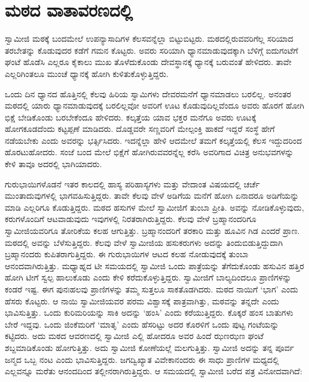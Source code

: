 
\chapter{ಮಠದ ವಾತಾವರಣದಲ್ಲಿ}

 ಸ್ವಾಮೀಜಿ ಮಠಕ್ಕೆ ಬಂದಮೇಲೆ ಉಪನ್ಯಾಸಾದಿಗಳ ಕೆಲಸವನ್ನೆಲ್ಲಾ ಬಿಟ್ಟುಬಿಟ್ಟರು. ಮಠದಲ್ಲಿರುವವರಿಗೆಲ್ಲ ಸರಿಯಾದ ತರಬೇತನ್ನು ಕೊಡುವುದರ ಕಡೆಗೆ ಗಮನ ಕೊಟ್ಟರು. ಅವರು ಸರಿಯಾಗಿ ಧ್ಯಾನಮಾಡುವುದಕ್ಕಾಗಿ ಬೆಳಿಗ್ಗೆ ಐದುಗಂಟೆಗೆ ಘಂಟೆ ಹೊಡೆಸಿ ಎಲ್ಲರೂ ಕೈಕಾಲು ಮುಖ ತೊಳೆದುಕೊಂಡು ದೇವಸ್ಥಾನಕ್ಕೆ ಧ್ಯಾನಕ್ಕೆ ಬರುವಂತೆ ಹೇಳಿದರು. ತಾವೇ ಎಲ್ಲರಿಗಿಂತಲೂ ಮುಂಚೆ ಧ್ಯಾನಕ್ಕೆ ಹೋಗಿ ಕುಳಿತುಕೊಳ್ಳುತ್ತಿದ್ದರು. 

 ಒಂದು ದಿನ ಧ್ಯಾನದ ಹೊತ್ತಿನಲ್ಲಿ ಕೆಲವು ಹಿರಿಯ ಸ್ವಾಮಿಗಳು ದೇವರಮನೆಗೆ ಧ್ಯಾನಮಾಡಲು ಬರಲಿಲ್ಲ. ಅನಂತರ ಮಠದಲ್ಲಿ ಯಾರು ಧ್ಯಾನಮಾಡುವುದಕ್ಕೆ ಬರಲಿಲ್ಲವೋ ಅವರಿಗೆ ಊಟ ಕೊಡುವುದಿಲ್ಲವೆಂದೂ ಅವರು ಹೊರಗೆ ಹೋಗಿ ಭಿಕ್ಷೆ ಬೇಡಿಕೊಂಡು ಬರಬೇಕೆಂದೂ ಹೇಳಿದರು. ಕಲ್ಕತ್ತೆಯ ಯಾವ ಭಕ್ತರ ಮನೆಗೂ ಅವರು ಊಟಕ್ಕೆ ಹೋಗಕೂಡದೆಂದು ಕಟ್ಟಪ್ಪಣೆ ಮಾಡಿದರು. ದೊಡ್ಡವರೇ ಸಣ್ಣವರಿಗೆ ಮೇಲ್ಪಂಕ್ತಿ ಹಾಕದೆ ಇದ್ದರೆ ಸಂಸ್ಥೆ ಹೇಗೆ ನಡೆಯಬೇಕು ಎಂದು ಅವರನ್ನು ಭರ್ತ್ಸಿಸಿದರು. ಇದನ್ನೆಲ್ಲಾ ಹೇಳಿ ಆದಮೇಲೆ ತಮಗೆ ಕಲ್ಕತ್ತೆಯಲ್ಲಿ ಕೆಲಸ ಇದ್ದುದರಿಂದ ಹೊರಟುಹೋದರು. ಸಂಜೆ ಬಂದ ಮೇಲೆ ಭಿಕ್ಷೆಗೆ ಹೋಗಿರುವವರನ್ನೆಲ್ಲ ಕರೆಸಿ ಅವರಿಗಾದ ವಿಚಿತ್ರ ಅನುಭವಗಳನ್ನು ಕೇಳಿ ತಾವೂ ಅದರಲ್ಲಿ ಭಾಗಿಯಾದರು. 

 ಗುರುಭಾಯಿಗಳೊಡನೆ ಇತರ ಕಾಲದಲ್ಲಿ ಹಾಸ್ಯ ಪರಿಹಾಸ್ಯಗಳು ಮತ್ತು ವೇದಾಂತ ವಿಷಯದಲ್ಲಿ ಚರ್ಚೆ ಮುಂತಾದುವುಗಳಲ್ಲಿ ಭಾಗವಹಿಸುತ್ತಿದ್ದರು. ತಾವೇ ಕೆಲವು ವೇಳೆ ಅಡಿಗೆಯ ಮನೆಗೆ ಹೋಗಿ ಏನಾದರೂ ಅಡಿಗೆಯನ್ನು ಮಾಡಿ ಎಲ್ಲರಿಗೂ ಕೊಡುತ್ತಿದ್ದರು. ಮಠದ ಹಸುಗಳ ಮೇಲೆ ಸ್ವಾಮೀಜಿಗೆ ತುಂಬಾ ಪ್ರೀತಿ. ಅವನ್ನು ನೋಡಿಕೊಳ್ಳುವುದು, ಕರುಗಳೊಂದಿಗೆ ಆಟವಾಡುವುದು ಇವುಗಳಲ್ಲಿ ನಿರತರಾಗಿರುತ್ತಿದ್ದರು. ಕೆಲವು ವೇಳೆ ಬ್ರಹ್ಮಾನಂದರಿಗೂ ಸ್ವಾಮೀಜಿಯವರಿಗೂ ತೋರಿಕೆಯ ಕಲಹ ಆಗುತ್ತಿತ್ತು. ಬ್ರಹ್ಮಾನಂದರಿಗೆ ತರಕಾರಿ ಮತ್ತು ಹೂವಿನ ಗಿಡ ಎಂದರೆ ಪ್ರಾಣ. ಮಠದಲ್ಲಿ ಅವನ್ನು ಬೆಳೆಸುತ್ತಿದ್ದರು. ಕೆಲವು ವೇಳೆ ಸ್ವಾಮೀಜಿಯ ಹಸುಕರುಗಳು ಅದನ್ನು ತಿಂದುಬಿಡುತ್ತಿದ್ದುದಾಗಿ ಬ್ರಹ್ಮಾನಂದರು ಕುಪಿತರಾಗುತ್ತಿದ್ದರು. ಈ ಗುರುಭಾಯಿಗಳ ಆಟದ ಕಲಹ ನೋಡುವುದಕ್ಕೆ ತುಂಬಾ ಆನಂದವಾಗಿರುತ್ತಿತ್ತು. ಮಧ್ಯಾಹ್ನದ ಟೀ ಸಮಯದಲ್ಲಿ ಸ್ವಾಮೀಜಿ ಒಂದು ಪಾತ್ರೆಯನ್ನು ತೆಗೆದುಕೊಂಡು ಹಸುವಿನ ಹತ್ತಿರ ಹೋಗಿ ಟೀಗೆ ಸ್ವಲ್ಪ ಹಾಲುಕೊಡು ಎಂದು ಕೇಳಿ ಕರೆದುಕೊಳ್ಳುತ್ತಿದ್ದರು. ಸ್ವಾಮೀಜಿಗೆ ಬಾಲ್ಯದಿಂದಲೂ ಪ್ರಾಣಿಗಳನ್ನು ಕಂಡರೆ ಇಷ್ಟ. ಈಗ ಪುನಃ\break ಹಲವು ಪ್ರಾಣಿಗಳನ್ನು ತಮ್ಮ ಸುತ್ತಲೂ ಸಾಕತೊಡಗಿದರು. ಮಠದ ನಾಯಿಗೆ ‘ಭಾಗ’ ಎಂದು ಹೆಸರು ಕೊಟ್ಟರು. ಆ ನಾಯಿ ಸ್ವಾಮೀಜಿಯವರ ಪರಮ ವಿಶ್ವಾಸಕ್ಕೆ ಪಾತ್ರವಾಗಿತ್ತು, ಮಠವನ್ನು ತನ್ನದೇ ಎಂದು ಭಾವಿಸುತ್ತಿತ್ತು. ಒಂದು ಕುರಿಮರಿಯನ್ನು ಸಾಕಿ ಅದನ್ನು ‘ಹಂಸಿ’ ಎಂದು ಕರೆಯುತ್ತಿದ್ದರು. ಕೊಕ್ಕರೆ ಹಂಸ ಬಾತುಗಳು ಬೇರೆ ಇದ್ದವು. ಒಂದು ಜಿಂಕೆಮರಿಗೆ ‘ಮಾತೃ’ ಎಂದು ಹೆಸರಿಟ್ಟು ಅದರ ಕೊರಳಿಗೆ ಒಂದು ಪುಟ್ಟ ಗಂಟೆಯನ್ನು ಕಟ್ಟಿದರು. ಅದು ಮಠದ ಆವರಣದಲ್ಲಿ ಸ್ವಾಮೀಜಿ ಎಲ್ಲಿ ಹೋದರೂ ಅವರ ಹಿಂದೆ ಝಣಝಣ ಘಂಟೆ ಶಬ್ದಮಾಡಿಕೊಂಡು ಹೋಗುತ್ತಿತ್ತು. ಅದು ಸ್ವಾಮೀಜಿ ಕೋಣೆಯಲ್ಲೆ ಮಲಗುತ್ತಿತ್ತು. ಸ್ವಾಮೀಜಿ ಅದನ್ನು ತನ್ನ ಪೂರ್ವ ಜನ್ಮದ ಒಬ್ಬ ನಂಟ ಎಂದು ಭಾವಿಸುತ್ತಿದ್ದರು. ಜಗದ್ವಿಖ್ಯಾತ ವಿವೇಕಾನಂದರು ಈ ಸಾಧು ಪ್ರಾಣಿಗಳ ಮಧ್ಯದಲ್ಲಿ ಎಲ್ಲವನ್ನೂ ಮರೆತು ಆನಂದದಿಂದ ತಲ್ಲೀನರಾಗಿರುತ್ತಿದ್ದರು. ಆ ಸಮಯದಲ್ಲಿ ಸ್ವಾಮೀಜಿ ಬರೆದ ಪತ್ರ ವಿನೋದವಾಗಿದೆ: 

